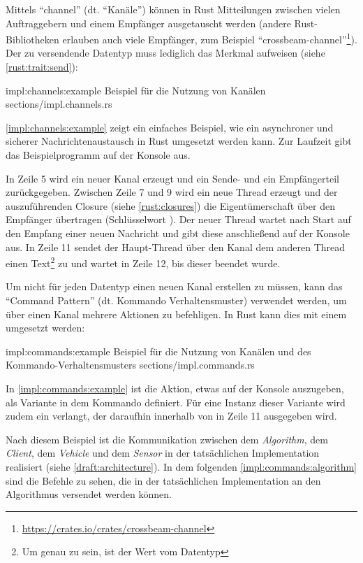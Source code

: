 Mittels \enquote{channel} (dt. \enquote{Kanäle}) können in Rust Mitteilungen zwischen vielen Auftraggebern und einem Empfänger ausgetauscht werden (andere Rust-Bibliotheken erlauben auch viele Empfänger, zum Beispiel \enquote{crossbeam-channel}\footnote{\url{https://crates.io/crates/crossbeam-channel}}).
Der zu versendende Datentyp muss lediglich das Merkmal  aufweisen (siehe \autoref{rust:trait:send}):

\rustcinclude
	{impl:channels:example}
	{Beispiel für die Nutzung von Kanälen}
	{sections/impl.channels.rs}

\autoref{impl:channels:example} zeigt ein einfaches Beispiel, wie ein asynchroner  und sicherer Nachrichtenaustausch in Rust umgesetzt werden kann.
Zur Laufzeit gibt das Beispielprogramm  auf der Konsole aus.

In Zeile 5 wird ein neuer Kanal erzeugt und ein Sende- und ein Empfängerteil zurückgegeben.
Zwischen Zeile 7 und 9 wird ein neue Thread erzeugt und der auszuführenden Closure (siehe \autoref{rust:closures}) die Eigentümerschaft über den Empfänger übertragen (Schlüsselwort ).
Der neuer Thread wartet nach Start auf den Empfang einer neuen Nachricht und gibt diese anschließend auf der Konsole aus.
In Zeile 11 sendet der Haupt-Thread über den Kanal dem anderen Thread einen Text\footnote{Um genau zu sein, ist der Wert vom Datentyp  } zu und wartet in Zeile 12, bis dieser beendet wurde.

Um nicht für jeden Datentyp einen neuen Kanal erstellen zu müssen, kann das \enquote{Command Pattern} (dt. Kommando Verhaltensmuster) \cite[153]{goll2014architektur} verwendet werden, um über einen Kanal mehrere Aktionen zu befehligen.
In Rust kann dies mit einem  umgesetzt werden:

\rustcinclude
	{impl:commands:example}
	{Beispiel für die Nutzung von Kanälen und des Kommando-Verhaltensmusters}
	{sections/impl.commands.rs}
	
In \autoref{impl:commands:example} ist die Aktion, etwas auf der Konsole auszugeben, als Variante  in dem Kommando definiert.
Für eine Instanz dieser Variante wird zudem ein  verlangt, der daraufhin innerhalb von  in Zeile 11 ausgegeben wird.

Nach diesem Beispiel ist die Kommunikation zwischen dem \textit{Algorithm}, dem \textit{Client}, dem \textit{Vehicle} und dem \textit{Sensor} in der tatsächlichen Implementation realisiert (siehe \autoref{draft:architecture}).
In dem folgenden \autoref{impl:commands:algorithm} sind die Befehle zu sehen, die in der tatsächlichen Implementation an den Algorithmus versendet werden können.

